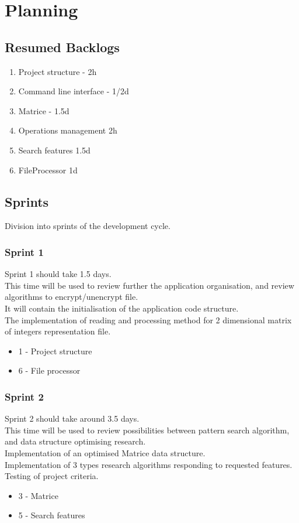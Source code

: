 \chapter{Planning}

\section{Resumed Backlogs}
\begin{enumerate}
    \item Project structure - 2h
    \item Command line interface - 1/2d
    \item Matrice - 1.5d
    \item Operations management 2h
    \item Search features 1.5d
    \item FileProcessor 1d
\end{enumerate}

\section{Sprints}

Division into sprints of the development cycle.

\subsection{Sprint 1}
Sprint 1 should take 1.5 days.\\
This time will be used to review further the application organisation, and review algorithms to encrypt/unencrypt file.\\
It will contain the initialisation of the application code structure.\\
The implementation of reading and processing method for 2 dimensional matrix of integers representation file.\\
    \begin{itemize}
        \item 1 - Project structure
        \item 6 - File processor
    \end{itemize}

\subsection{Sprint 2}
Sprint 2 should take around 3.5 days.\\
This time will be used to review possibilities between pattern search algorithm, and data structure optimising research.\\
Implementation of an optimised Matrice data structure.\\
Implementation of 3 types research algorithms responding to requested features.\\
Testing of project criteria.
    \begin{itemize}
        \item 3 - Matrice
        \item 5 - Search features
    \end{itemize}

